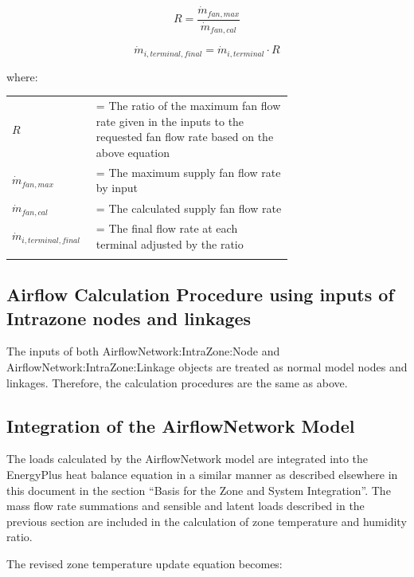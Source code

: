 \begin{equation}
R = \frac{{{{\dot m}_{fan,max}}}}{{{{\dot m}_{fan,cal}}}}
\end{equation}

\begin{equation}
{\dot m_{i,terminal,final}} = {\dot m_{i,terminal}}\cdot R
\end{equation}

where:

\begin{tabular}{lp{0.7\linewidth}}
\\
$R$ &= The ratio of the maximum fan flow rate given in the inputs to the requested fan flow rate based on the above equation\\
$\dot{m}_{fan,max}$ &= The maximum supply fan flow rate by input\\
$\dot{m}_{fan,cal}$ &= The calculated supply fan flow rate\\
$\dot{m}_{i,terminal,final}$ &= The final flow rate at each terminal adjusted by the ratio\\
\\
\end{tabular}

\subsection{Airflow Calculation Procedure using inputs of Intrazone nodes and linkages}\label{airflow-calculation-procedure-using-inputs-of-intrazone-nodes-and-linkages}

The inputs of both AirflowNetwork:IntraZone:Node and AirflowNetwork:IntraZone:Linkage objects are treated as normal model nodes and linkages. Therefore, the calculation procedures are the same as above.

\subsection{Integration of the AirflowNetwork Model}\label{integration-of-the-airflownetwork-model}

The loads calculated by the AirflowNetwork model are integrated into the EnergyPlus heat balance equation in a similar manner as described elsewhere in this document in the section ``Basis for the Zone and System Integration''. The mass flow rate summations and sensible and latent loads described in the previous section are included in the calculation of zone temperature and humidity ratio.

The revised zone temperature update equation becomes:

